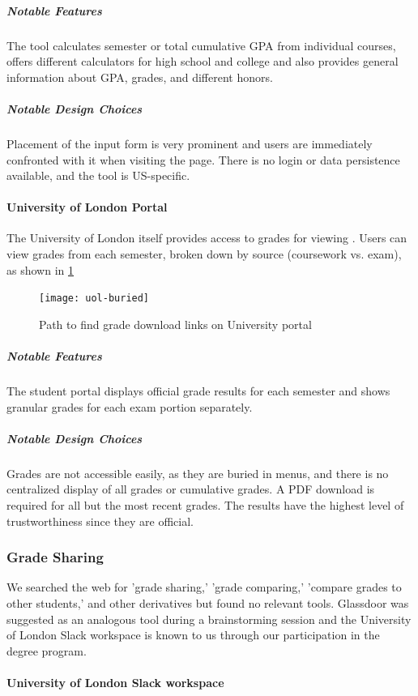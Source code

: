 \subparagraph{Notable Features}
The tool calculates semester or total cumulative GPA from individual courses, offers different calculators for high school and college and also provides general information about GPA, grades, and different honors.

\subparagraph{Notable Design Choices}
Placement of the input form is very prominent and users are immediately confronted with it when visiting the page. There is no login or data persistence available, and the tool is US-specific.

\paragraph{University of London Portal}

The University of London itself provides access to grades for viewing \cite{uol}. Users can view grades from each semester, broken down by source (coursework vs. exam), as shown in \cref{fig:uol-grades}

\begin{figure}[H]
\noindent \texttt{[image: uol-buried]}
\centering
\caption{Path to find grade download links on University portal}
\label{fig:uol-grades}
\end{figure}

\subparagraph{Notable Features}
The student portal displays official grade results for each semester and shows granular grades for each exam portion separately.

\subparagraph{Notable Design Choices}
Grades are not accessible easily, as they are buried in menus, and there is no centralized display of all grades or cumulative grades. A PDF download is required for all but the most recent grades. The results have the highest level of trustworthiness since they are official.

\subsubsection{Grade Sharing}

We searched the web for 'grade sharing,' 'grade comparing,' 'compare grades to other students,' and other derivatives but found no relevant tools. Glassdoor was suggested as an analogous tool during a brainstorming session and the University of London Slack workspace is known to us through our participation in the degree program.

\paragraph{University of London Slack workspace}

